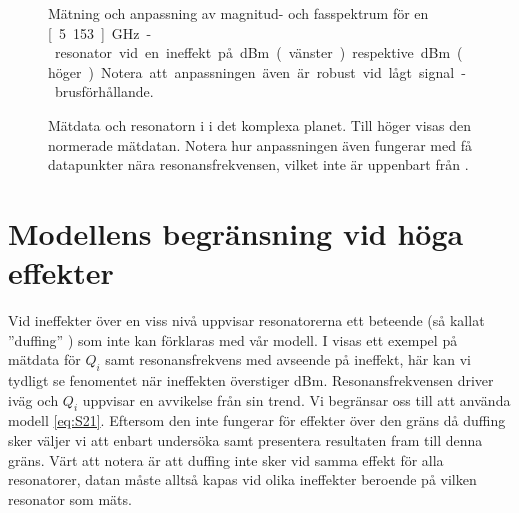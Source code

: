 \documentclass[main.tex]{subfiles}
\begin{document}
\begin{figure}[H]
    \centering
    \begin{subfigure}[t]{0.45\textwidth}
        \centerfloat
        \setlength{}
        \setlength\figureheight{12em}
        
    \end{subfigure}
    \begin{subfigure}[t]{0.45\textwidth}
        \centerfloat
        \setlength{}
        \setlength\figureheight{12em}
        
    \end{subfigure}
    \caption{Mätning och anpassning av magnitud- och fasspektrum för en \unit[5.153]{GHz}-resonator vid en ineffekt på \unit[-40]{dBm} (vänster) respektive \unit[-70]{dBm} (höger). Notera att anpassningen även är robust vid lågt signal-brusförhållande.}
    \label{fig:ex_magphs_resonator}
\end{figure}

\begin{figure}[H]
    \centering
    \begin{subfigure}[t]{0.375\textwidth}
        \centerfloat
        \setlength{}
        \setlength\figureheight{10em}
        
    \end{subfigure}
    \begin{subfigure}[t]{0.375\textwidth}
        \centerfloat
        \setlength{}
        \setlength\figureheight{10em}
        
    \end{subfigure}
    \caption{Mätdata och resonatorn i  i det komplexa planet. Till höger visas den normerade mätdatan. Notera hur anpassningen även fungerar med få datapunkter nära resonansfrekvensen, vilket inte är uppenbart från . }
    \label{fig:ex_cmplx_resonator}
\end{figure}

\section{Modellens begränsning vid höga effekter}
Vid ineffekter över en viss nivå uppvisar resonatorerna ett beteende (så kallat ''duffing'' \cite{tholen2007}) som inte kan förklaras med vår modell. I  visas ett exempel på mätdata för $Q_i$ samt resonansfrekvens med avseende på ineffekt, här kan vi tydligt se fenomentet när ineffekten överstiger \unit[-70]{dBm}. Resonansfrekvensen driver iväg och $Q_i$ uppvisar en avvikelse från sin trend. Vi begränsar oss till att använda modell \ref{eq:S21}. Eftersom den inte fungerar för effekter över den gräns då duffing sker väljer vi att enbart undersöka samt presentera resultaten fram till denna gräns. Värt att notera är att duffing inte sker vid samma effekt för alla resonatorer, datan måste alltså kapas vid olika ineffekter beroende på vilken resonator som mäts.
\end{document}
